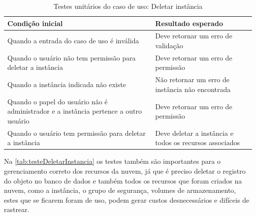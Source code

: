\begin{table}[h]
\caption{Testes unitários do caso de uso: Deletar instância}
\label{tab:testeDeletarInstancia}
\begin{tabularx}{\textwidth}{p{} p{}}
\toprule
\textbf{Condição inicial} & \textbf{Resultado esperado} \\ \midrule

Quando a entrada do caso de uso é inválida & Deve retornar um erro de validação \\ \hline

Quando o usuário não tem permissão para deletar a instância & Deve retornar um erro de permissão \\ \hline

Quando a instância indicada não existe & Não retornar um erro de instância não encontrada \\ \hline

Quando o papel do usuário não é administrador e a instância pertence a outro usuário & Deve retornar um erro de permissão \\ \hline

Quando o usuário tem permissão para deletar a instância & Deve deletar a instância e todos os recursos associados \\

\bottomrule
\end{tabularx}
\end{table}

Na \autoref{tab:testeDeletarInstancia} os testes também são importantes para o gerenciamento correto dos recursos da nuvem, já que é preciso deletar o registro do objeto no banco de dados e também todos os recursos que foram criados na nuvem, como a instância, o grupo de segurança, volumes de armazenamento, estes que se ficarem foram de uso, podem gerar custos desnecessários e difíceis de rastrear.



